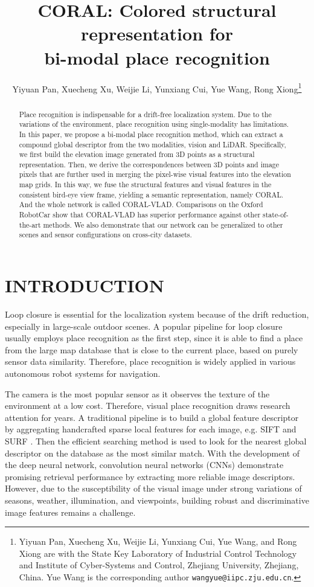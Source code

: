 \documentclass[letterpaper, 10 pt, conference]{ieeeconf}  \usepackage{tabularx}
\title{\LARGE \bf
CORAL: Colored structural representation for \\bi-modal place recognition
}
\author{Yiyuan Pan, Xuecheng Xu, Weijie Li, Yunxiang Cui, Yue Wang, Rong Xiong\thanks{Yiyuan Pan, Xuecheng Xu, Weijie Li, Yunxiang Cui, Yue Wang, and Rong Xiong are with the State Key Laboratory of Industrial Control Technology and Institute of Cyber-Systems and Control, Zhejiang University, Zhejiang, China. Yue Wang is the corresponding author {\tt\small wangyue@iipc.zju.edu.cn}.}
}
\begin{document}
\maketitle
\thispagestyle{empty}
\pagestyle{empty}


\begin{abstract}
	
Place recognition is indispensable for a drift-free localization system. Due to the variations of the environment, place recognition using single-modality has limitations. In this paper, we propose a bi-modal place recognition method, which can extract a compound global descriptor from the two modalities, vision and LiDAR. Specifically, we first build the elevation image generated from 3D points as a structural representation. Then, we derive the correspondences between 3D points and image pixels that are further used in merging the pixel-wise visual features into the elevation map grids. In this way, we fuse the structural features and visual features in the consistent bird-eye view frame, yielding a semantic representation, namely CORAL. And the whole network is called CORAL-VLAD. Comparisons on the Oxford RobotCar show that CORAL-VLAD has superior performance against other state-of-the-art methods. We also demonstrate that our network can be generalized to other scenes and sensor configurations on cross-city datasets.
\end{abstract}






\section{INTRODUCTION}

Loop closure is essential for the localization system because of the drift reduction, especially in large-scale outdoor scenes. A popular pipeline for loop closure usually employs place recognition as the first step, since it is able to find a place from the large map database that is close to the current place, based on purely sensor data similarity. Therefore, place recognition is widely applied in various autonomous robot systems for navigation.

The camera is the most popular sensor as it observes the texture of the environment at a low cost. Therefore, visual place recognition draws research attention for years. A traditional pipeline is to build a global feature descriptor by aggregating handcrafted sparse local features for each image, e.g. SIFT \cite{lowe2004distinctive} and SURF \cite{bay2008speeded}. Then the efficient searching method is used to look for the nearest global descriptor on the database as the most similar match. With the development of the deep neural network, convolution neural networks (CNNs) demonstrate promising retrieval performance \cite{arandjelovic2016netvlad, noh2017large,tang2020adversarial} by extracting more reliable image descriptors. However, due to the susceptibility of the visual image under strong variations of seasons, weather, illumination, and viewpoints, building robust and discriminative image features remains a challenge.
\end{document}
